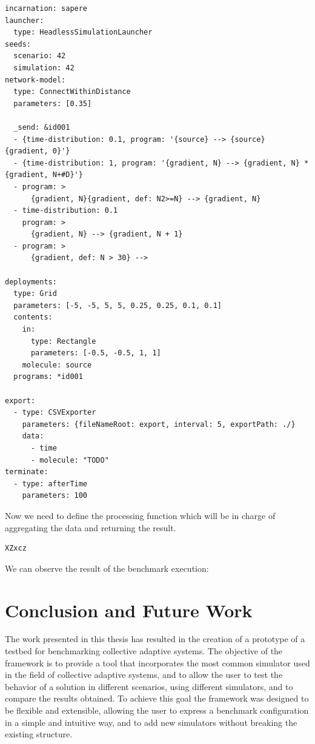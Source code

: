 \documentclass[12pt,a4paper,openright,twoside]{book}
\begin{document}
\begin{lstlisting}[caption={Case of study: Alchemist input file}]
incarnation: sapere
launcher:
  type: HeadlessSimulationLauncher
seeds:
  scenario: 42
  simulation: 42
network-model:
  type: ConnectWithinDistance
  parameters: [0.35]

  _send: &id001
  - {time-distribution: 0.1, program: '{source} --> {source} {gradient, 0}'}
  - {time-distribution: 1, program: '{gradient, N} --> {gradient, N} *{gradient, N+#D}'}
  - program: >
      {gradient, N}{gradient, def: N2>=N} --> {gradient, N}
  - time-distribution: 0.1
    program: >
      {gradient, N} --> {gradient, N + 1}
  - program: >
      {gradient, def: N > 30} -->

deployments:
  type: Grid
  parameters: [-5, -5, 5, 5, 0.25, 0.25, 0.1, 0.1]
  contents:
    in:
      type: Rectangle
      parameters: [-0.5, -0.5, 1, 1]
    molecule: source
  programs: *id001
  
export:
  - type: CSVExporter
    parameters: {fileNameRoot: export, interval: 5, exportPath: ./}
    data: 
      - time
      - molecule: "TODO"
terminate:
  - type: afterTime
    parameters: 100
\end{lstlisting}

Now we need to define the processing function which will be in charge of aggregating the data and returning the result.

\lstset{style=my-kotlin}
\begin{lstlisting}[language=my-kotlin, caption={Case of study: Output processing function.}]
  XZxcz
\end{lstlisting}

We can observe the result of the benchmark execution:

\chapter{Conclusion and Future Work}

The work presented in this thesis has resulted in the creation of a prototype of a testbed for benchmarking collective adaptive systems.
The objective of the framework is to provide a tool that incorporates the most common simulator used in the field of collective adaptive systems,
and to allow the user to test the behavior of a solution in different scenarios, using different simulators, and to compare the results obtained.
To achieve this goal the framework was designed to be flexible and extensible, allowing the user to express a benchmark configuration in a simple and intuitive way, and to add new simulators without breaking the existing structure.
\end{document}

